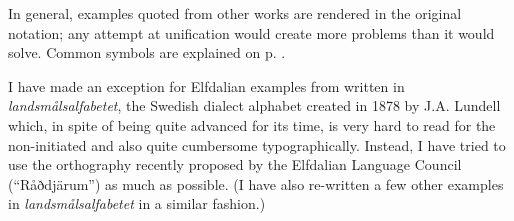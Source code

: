 In general, examples quoted from other works are rendered in the original notation; any attempt at unification would create more problems than it would solve. Common symbols are explained on p. \pageref{bkm:Ref224104485}.


I have made an exception for Elfdalian examples from \citet{Levander1909} written in \textit{landsmålsalfabetet}, the Swedish dialect alphabet created in 1878 by J.A. Lundell which, in spite of being quite advanced for its time, is very hard to read for the non-initiated and also quite cumbersome typographically. Instead, I have tried to use the orthography recently proposed by the Elfdalian Language Council (“Råðdjärum”) as much as possible. (I have also re-written a few other examples in \textit{landsmålsalfabetet }in a similar fashion.)

